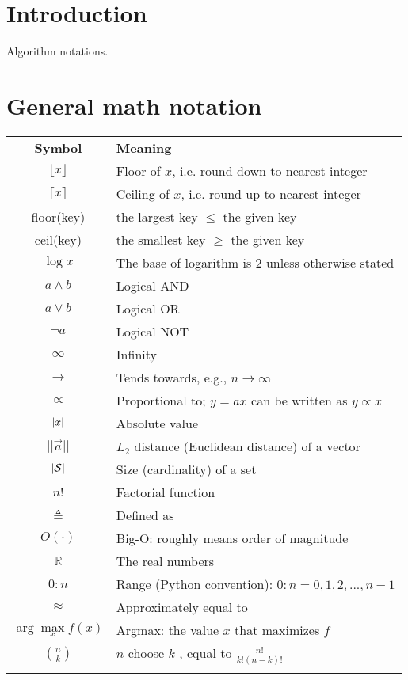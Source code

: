\label{sec:Notation}

\section*{Introduction}
Algorithm notations. 


\section*{General math notation}

\begin{longtable}{cl}
\hline\noalign{\smallskip}
\textbf{Symbol} & \textbf{Meaning} \\
\noalign{\smallskip}\hline\noalign{\smallskip}
$\lfloor x \rfloor$ & Floor of $x$, i.e. round down to nearest integer\\
$\lceil x \rceil$ & Ceiling of $x$, i.e. round up to nearest integer\\
floor(key) & the largest key $\leq$ the given key \\
ceil(key) & the smallest key $\geq$ the given key \\
$\log x$ & The base of logarithm is 2 unless otherwise stated\\
$a \wedge b$ & Logical AND\\
$a \vee b$ & Logical OR\\
$\neg a$ & Logical NOT\\
$\infty$ & Infinity\\
$\rightarrow$ & Tends towards, e.g., $n \rightarrow \infty$\\
$\propto$ &Proportional to; $y = ax$ can be written as $y \propto x$\\
$\left\lvert x\right\rvert$ & Absolute value\\
$||\vec{a}||$ & $L_2$ distance (Euclidean distance) of a vector \\
$\left\lvert\mathcal{S}\right\rvert$ & Size (cardinality) of a set\\
$n!$ & Factorial function\\
$\triangleq$ & Defined as\\
$O(\cdot)$ & Big-O: roughly means order of magnitude\\
$\mathbb{R}$ & The real numbers\\
$0:n$ & Range (Python convention): $0:n = {0, 1, 2,...,n-1}$\\
$\approx$ & Approximately equal to\\
$\arg\max\limits_x f(x)$ & Argmax: the value $x$ that maximizes $f$\\
$\binom{n}{k}$ & $n$ choose $k$ , equal to $\frac{n!}{k!(n-k)!}$\\
\noalign{\smallskip}\hline\noalign{\smallskip}
\end{longtable}


\twocolumn
